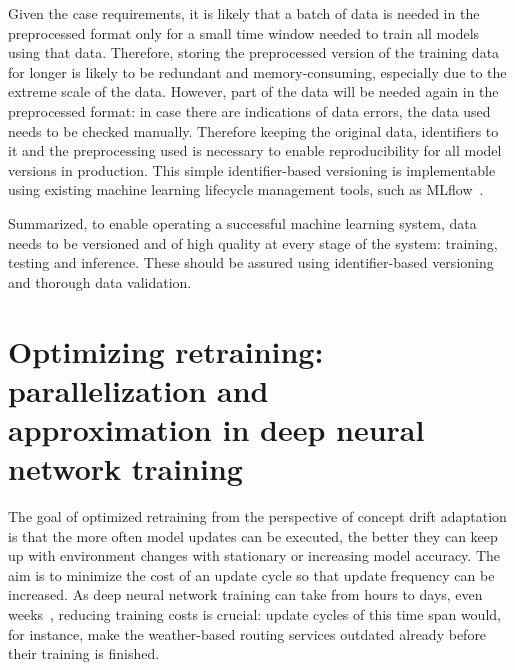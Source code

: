 Given the case requirements, it is likely that a batch of data is needed in the preprocessed format only for a small time window needed to train all models using that data. Therefore, storing the preprocessed version of the training data for longer is likely to be redundant and memory-consuming, especially due to the extreme scale of the data. However, part of the data will be needed again in the preprocessed format: in case there are indications of data errors, the data used needs to be checked manually. Therefore keeping the original data, identifiers to it and the preprocessing used is necessary to enable reproducibility for all model versions in production. This simple identifier-based versioning is implementable using existing machine learning lifecycle management tools, such as MLflow~\cite{mlflow}.

Summarized, to enable operating a successful machine learning system, data needs to be versioned and of high quality at every stage of the system: training, testing and inference. These should be assured using identifier-based versioning and thorough data validation.

\section[Optimizing retraining: parallelization and approximation in deep neural network training]{Optimizing retraining: parallelization and \\approximation in deep neural network training}



The goal of optimized retraining from the perspective of concept drift adaptation is that the more often model updates can be executed, the better they can keep up with environment changes with stationary or increasing model accuracy. The aim is to minimize the cost of an update cycle so that update frequency can be increased. As deep neural network training can take from hours to days, even weeks~\cite{szeEfficientProcessingDeep2017}, reducing training costs is crucial: update cycles of this time span would, for instance, make the weather-based routing services outdated already before their training is finished.

